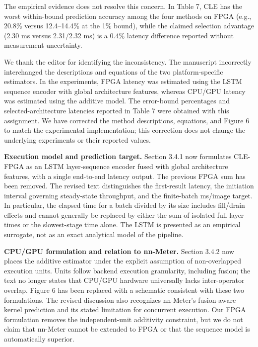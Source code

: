 \documentclass[11pt]{article}
\newcommand{\response}[1]{%
  \Needspace{3\baselineskip}%
  \par\noindent{\color{responseblue}\textbf{Response to #1:}}\par
  \vspace{1mm}\color{responseblue}}
\begin{document}
\begin{enumerate}[leftmargin=0pt,label={},itemsep=5mm]
The empirical evidence does not resolve this concern. In Table 7, CLE has the worst within-bound prediction accuracy among the four methods on FPGA (e.g., 20.8\% versus 12.4--14.4\% at the 1\% bound), while the claimed selection advantage (2.30 ms versus 2.31/2.32 ms) is a 0.4\% latency difference reported without measurement uncertainty.
\response{Major Comment 4}
\begingroup
\normalfont\color{responseblue}
We thank the editor for identifying the inconsistency. The manuscript incorrectly interchanged the descriptions and equations of the two platform-specific estimators. In the experiments, FPGA latency was estimated using the LSTM sequence encoder with global architecture features, whereas CPU/GPU latency was estimated using the additive model. The error-bound percentages and selected-architecture latencies reported in Table 7 were obtained with this assignment. We have corrected the method descriptions, equations, and Figure 6 to match the experimental implementation; this correction does not change the underlying experiments or their reported values.

\textbf{Execution model and prediction target.} Section 3.4.1 now formulates CLE-FPGA as an LSTM layer-sequence encoder fused with global architecture features, with a single end-to-end latency output. The previous FPGA sum has been removed. The revised text distinguishes the first-result latency, the initiation interval governing steady-state throughput, and the finite-batch ms/image target. In particular, the elapsed time for a batch divided by its size includes fill/drain effects and cannot generally be replaced by either the sum of isolated full-layer times or the slowest-stage time alone. The LSTM is presented as an empirical surrogate, not as an exact analytical model of the pipeline.

\textbf{CPU/GPU formulation and relation to nn-Meter.} Section 3.4.2 now places the additive estimator under the explicit assumption of non-overlapped execution units. Units follow backend execution granularity, including fusion; the text no longer states that CPU/GPU hardware universally lacks inter-operator overlap. Figure 6 has been replaced with a schematic consistent with these two formulations. The revised discussion also recognizes nn-Meter's fusion-aware kernel prediction and its stated limitation for concurrent execution. Our FPGA formulation removes the independent-unit additivity constraint, but we do not claim that nn-Meter cannot be extended to FPGA or that the sequence model is automatically superior.


\end{enumerate}
\end{document}

